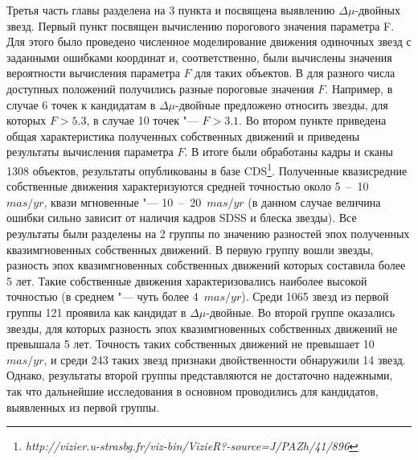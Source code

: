 Третья часть главы разделена на 3 пункта и посвящена выявлению $\Delta\mu$-двойных звезд. Первый пункт посвящен вычислению порогового значения параметра F. Для этого было проведено численное моделирование движения одиночных звезд с заданными ошибками координат и, соответственно, были вычислены значения вероятности вычисления параметра $F$ для таких объектов. В для разного числа доступных положений получились разные  пороговые значения $F$. Например, в случае 6 точек к кандидатам в $\Delta\mu$-двойные предложено относить звезды, для которых $F>5.3$, в случае 10 точек "--- $F>3.1$. Во втором пункте приведена общая характеристика полученных собственных движений и приведены результаты вычисления параметра $F$. В итоге были обработаны кадры и сканы 1308 объектов, результаты опубликованы в базе CDS\footnote{\textit{http://vizier.u-strasbg.fr/viz-bin/VizieR?-source=J/PAZh/41/896}}. Полученные квазисредние собственные движения характеризуются средней точностью около 5~--~10~$mas/yr$, квази мгновенные "--- 10~--~20~$mas/yr$ (в данном случае величина ошибки сильно зависит от наличия кадров SDSS и блеска звезды). Все результаты были разделены на 2 группы по значению разностей эпох полученных квазимгновенных собственных движений. В первую группу вошли звезды, разность эпох квазимгновенных собственных движений которых составила более 5 лет. Такие собственные движения характеризовались наиболее высокой точностью (в среднем "--- чуть более 4~$mas/yr$). Среди 1065 звезд из первой группы 121 проявила как кандидат в $\Delta\mu$-двойные. Во второй группе оказались звезды, для которых разность эпох квазимгновенных собственных движений не превышала 5 лет. Точность таких собственных движений не превышает 10~$mas/yr$, и среди 243 таких звезд признаки двойственности обнаружили 14 звезд. Однако, результаты второй группы представляются не достаточно надежными, так что дальнейшие исследования в основном проводились для кандидатов, выявленных из первой группы. 

